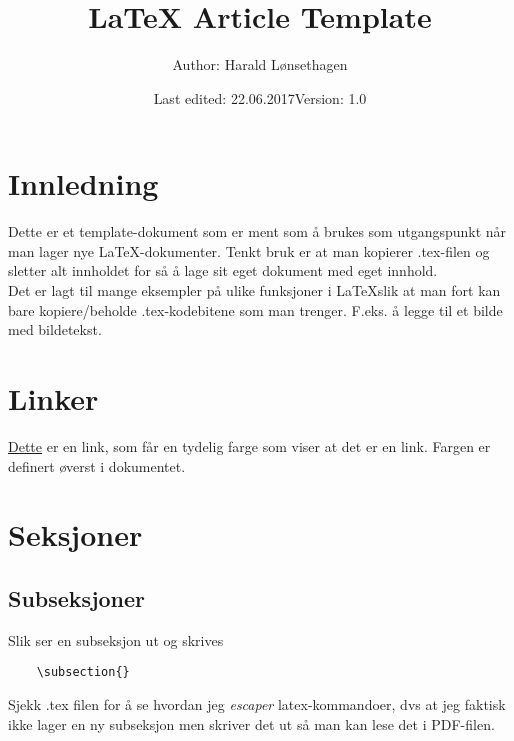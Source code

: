 \documentclass[11pt]{article}
\newcommand\tab[1][1cm]{\hspace*{#1}}
\begin{document}
\title{\textbf{LaTeX Article Template}}
\author{Author: Harald Lønsethagen}
\date{Last edited: 22.06.2017\tab Version: 1.0}

\maketitle
 

\makeatletter
\tableofcontents
\newpage

\section{Innledning}
Dette er et template-dokument som er ment som å brukes som utgangspunkt når man lager nye \LaTeX-dokumenter. Tenkt bruk er at man kopierer .tex-filen og sletter alt innholdet for så å lage sit eget dokument med eget innhold. \\
Det er lagt til mange eksempler på ulike funksjoner i \LaTeX \space slik at man fort kan bare kopiere/beholde .tex-kodebitene som man trenger. F.eks. å legge til et bilde med bildetekst. 

\section{Linker}
\href{www.vg.no}{Dette} er en link, som får en tydelig farge som viser at det er en link. Fargen er definert øverst i dokumentet.



\section{Seksjoner}
\subsection{Subseksjoner}
Slik ser en subseksjon ut og skrives
\begin{lstlisting}
	\subsection{}
\end{lstlisting}
Sjekk .tex filen for å se hvordan jeg \textit{escaper} latex-kommandoer, dvs at jeg faktisk ikke lager en ny subseksjon men skriver det ut så man kan lese det i PDF-filen.
\end{document}
